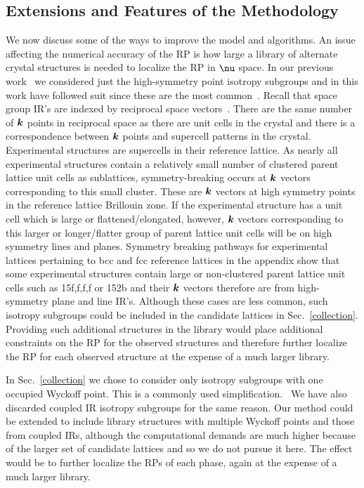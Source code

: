 \documentclass[preprint]{iucr}              %
\newcommand{\mb}[1]{\ensuremath{\mbox{\boldmath $ #1 $}}}
\begin{document}
\subsection{Extensions and Features of the Methodology}
\label{extensions}

We now discuss some of the ways to improve the model and algorithms.
An issue affecting the numerical accuracy of the RP is how large a
library of alternate crystal structures is needed to localize the RP
in $\mb{\nu}$ space. In our previous work~\cite{Mettes04} we
considered just the high-symmetry point isotropy subgroups and in
this work have followed suit since these are the most
common~\cite{Stokes88}. Recall that space group IR's are indexed by
reciprocal space vectors~\cite{Kovalev93,Zak69}. There are the same
number of $\mb{k}$ points in reciprocal space as there are unit
cells in the crystal and there is a correspondence between $\mb{k}$
points and supercell patterns in the crystal. Experimental
structures are supercells in their reference lattice. As nearly all
experimental structures contain a relatively small number of
clustered parent lattice unit cells as sublattices,
symmetry-breaking occurs at $\mb{k}$ vectors corresponding to this
small cluster.  These are $\mb{k}$ vectors at high symmetry points
in the reference lattice Brillouin zone. If the experimental
structure has a unit cell which is large or flattened/elongated,
however, $\mb{k}$ vectors corresponding to this larger or
longer/flatter group of parent lattice unit cells will be on high
symmetry lines and planes. Symmetry breaking pathways for experimental lattices
pertaining to bcc and fcc reference lattices in the appendix show that some experimental structures contain
large or non-clustered parent lattice unit cells such as 15f,f,f,f
or 152b and their $\mb{k}$ vectors therefore are from high-symmetry
plane and line IR's. Although these cases are less common, such
isotropy subgroups could be included in the candidate lattices in
Sec.~\ref{collection}. Providing such additional structures in the
library would place additional constraints on the RP for the
observed structures and therefore further localize the RP for each
observed structure at the expense of a much larger library.

In Sec.~\ref{collection} we chose to consider only isotropy
subgroups with one occupied Wyckoff point. This is a commonly used
simplification.~\cite{Verwer98} We have also discarded coupled IR
isotropy subgroups for the same reason. Our method could be extended
to include library structures with multiple Wyckoff points and those
from coupled IRs, although the computational demands are much higher
because of the larger set of candidate lattices and so we do not
pursue it here. The effect would be to further localize the RPs of
each phase, again at the expense of a much larger library.
\end{document}
